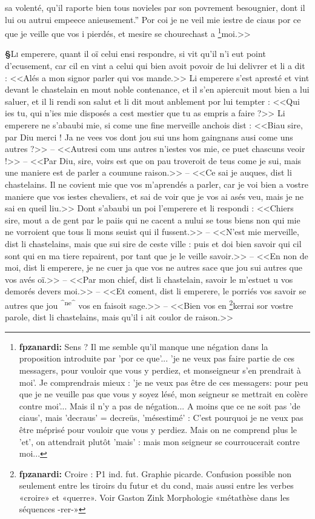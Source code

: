 \documentclass[12pt]{article} %
\newcommand{\add}[1]{\textsuperscript{#1}}       %
\newcommand{\supplied}[1]{\textlangle#1\textrangle} %
\newcommand{\fnfpz}[1]{\footnote{\textbf{fpzanardi:} #1}} %
\newcounter{paranum}
\newcommand{\pnum}{\stepcounter{paranum}\textbf{§\arabic{paranum}}\quad}
\begin{document}
sa volenté, qu'il raporte bien tous novieles par son povrement besougnier, dont il lui ou autrui empeece anieusement.'' Por coi je ne veil mie iestre de ciaus por ce que je veille que vos i pierdés, et mesire se chourechast a \fnfpz{Sens ? Il me semble qu'il manque une négation dans la proposition introduite par 'por ce que'... 'je ne veux pas faire partie de ces messagers, pour vouloir que vous y perdiez, et monseigneur s'en prendrait à moi'. Je comprendrais mieux : 'je ne veux pas être de ces messagers: pour peu que je ne veuille pas que vous y soyez lésé, mon seigneur se mettrait en colère contre moi'... Mais il n'y a pas de négation... A moins que ce ne soit pas 'de ciaus', mais 'decraus' = decreüs, 'mésestimé' : C'est pourquoi je ne veux pas être méprisé pour vouloir que vous y perdiez. Mais on ne comprend plus le 'et', on attendrait plutôt 'mais' : mais mon seigneur se courroucerait contre moi...}moi.>>


\pnum \lettrine[lines=3]{\color{darkblue}L}{i} emperere, quant il oï celui ens\supplied{i} respondre, si vit qu'il n'i eut point d'ecusement, car cil en vint a celui qui bien avoit povoir de lui delivrer et li a dit : <<Alés a mon signor parler qui vos mande.>> Li emperere s'est apresté et vint devant le chastelain en mout noble contenance, et il s'en apiercuit mout bien a lui saluer, et il li rendi son salut et li dit mout anbleme\supplied{n}t por lui tempter : <<Qui ies tu, qui n'ies mie disposés a cest mestier que tu as empris a faire ?>> Li emperere ne s'abaubi mie, si come une fine merveille anchois dist : <<Biau sire, par Diu merci ! Ja ne vees vos dont jou sui uns hom gaingnans ausi come uns autres ?>> -- <<Autresi com uns autres n'iestes vos mie, ce puet chascuns veoir !>> -- <<Par Diu, sire, voirs est que on pau troveroit de teus come je sui, mais une maniere est de parler a coumune raison.>> -- <<Ce sai je auques, dist li chastelains. Il ne covient mie que vos m'aprendés a parler, car je voi bien a vostre maniere que vos iestes chevaliers, et sai de voir que je vos ai asés veu, mais je ne sai en queil liu.>> Dont s'abaubi un poi l'emperere et li respondi : <<Chiers sire, mout a de gent par le paiis qui ne cacent a nului se tous biens non qui mie ne vorroient que tous li mons seuist qui il fussent.>> -- <<N'est mie merveille, dist li chastelains, mais que sui sire de ceste ville : puis et doi bien savoir qui cil sont qui en ma tiere repairent, por tant que je le veille savoir.>> -- <<En non de moi, dist li emperere, je ne cuer ja que vos ne autres sace que jou sui autres que vos avés oï.>> -- <<Par mon chief, dist li chastelain, savoir le m'estuet u vos demorés devers moi.>> -- <<Et coment, dist li emperere, le porriés vos savoir se autres que jou \add{^ne^} vos en faisoit sage.>> -- <<Bien vos en \fnfpz{Croire : P1 ind. fut. Graphie picarde. Confusion possible non seulement entre les tiroirs du futur et du cond, mais aussi entre les verbes «croire» et «querre». Voir Gaston Zink Morphologie «métathèse dans les séquences -rer-»}kerrai sor vostre parole, dist li chastelains, mais qu'il i ait coulor de raison.>>
\end{document}
